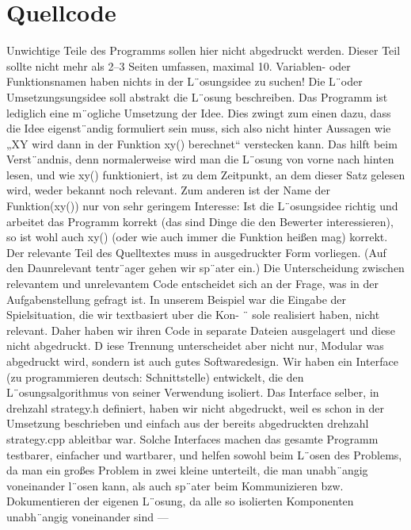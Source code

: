 \documentclass[a4paper,10pt,ngerman]{scrartcl}
\begin{document}
    \section{Quellcode}\label{sec:quellcode}
    Unwichtige Teile des Programms sollen hier nicht abgedruckt werden.
    Dieser Teil sollte nicht mehr als 2–3 Seiten umfassen, maximal 10.
    Variablen- oder Funktionsnamen haben nichts in der L¨osungsidee zu suchen!
    Die L¨oder Umsetzungsungsidee soll abstrakt die L¨osung beschreiben.
    Das Programm ist lediglich eine m¨ogliche Umsetzung der Idee.
    Dies zwingt zum einen dazu, dass die Idee eigenst¨andig formuliert sein muss, sich also
    nicht hinter Aussagen wie „XY wird dann in der Funktion xy() berechnet“ verstecken kann.
    Das hilft beim Verst¨andnis, denn normalerweise wird man die L¨osung von vorne
    nach hinten lesen, und wie xy() funktioniert, ist zu dem Zeitpunkt, an dem dieser Satz
    gelesen wird, weder bekannt noch relevant.
    Zum anderen ist der Name der Funktion(xy()) nur von sehr geringem Interesse:
    Ist die L¨osungsidee richtig und arbeitet das Programm korrekt (das sind Dinge die den Bewerter interessieren),
    so ist wohl auch xy() (oder wie auch immer die Funktion heißen mag) korrekt.
    Der relevante Teil des Quelltextes muss in ausgedruckter Form vorliegen. (Auf den Daunrelevant tentr¨ager gehen wir sp¨ater ein.) Die Unterscheidung zwischen relevantem und unrelevantem Code entscheidet sich an der Frage, was in der Aufgabenstellung gefragt ist. In
    unserem Beispiel war die Eingabe der Spielsituation, die wir textbasiert uber die Kon- ¨
    sole realisiert haben, nicht relevant.
    Daher haben wir ihren Code in separate Dateien
    ausgelagert und diese nicht abgedruckt. D
    iese Trennung unterscheidet aber nicht nur,
    Modular was abgedruckt wird, sondern ist auch gutes Softwaredesign.
    Wir haben ein Interface (zu
    programmieren deutsch: Schnittstelle) entwickelt, die den L¨osungsalgorithmus von seiner Verwendung
    isoliert.
    Das Interface selber, in drehzahl strategy.h definiert,
    haben wir nicht abgedruckt, weil es schon in der Umsetzung beschrieben und einfach aus
    der bereits abgedruckten drehzahl strategy.cpp ableitbar war.
    Solche Interfaces machen
    das gesamte Programm testbarer, einfacher und wartbarer, und helfen sowohl beim L¨osen
    des Problems, da man ein großes Problem in zwei kleine unterteilt, die man unabh¨angig
    voneinander l¨osen kann, als auch sp¨ater beim Kommunizieren bzw.
    Dokumentieren der
    eigenen L¨osung, da alle so isolierten Komponenten unabh¨angig voneinander sind —
\end{document}
